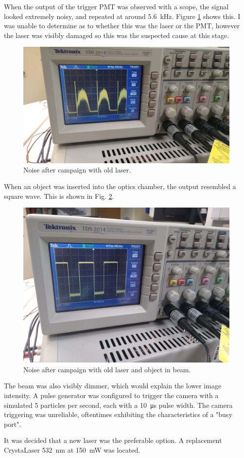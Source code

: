

When the output of the trigger PMT was observed with a scope, the signal looked extremely noisy, and repeated at around \SI{5.6}{\kilo\hertz}. Figure \ref{fig:PPDScopeNoise} shows this. I was unable to determine as to whether this was the laser or the PMT, however the laser was visibly damaged so this was the suspected cause at this stage.

\begin{figure}[H]
\begin{center}
\includegraphics[width=0.5\linewidth]{Figures/PPDScopeNoise}
\end{center}
\caption{Noise after campaign with old laser.}
\label{fig:PPDScopeNoise}
\end{figure}

When an object was inserted into the optics chamber, the output resembled a square wave. This is shown in Fig. \ref{fig:PPDScatterOutput}.

\begin{figure}[H]
\begin{center}
\includegraphics[width=0.5\linewidth]{Figures/PPDScatterOutput}
\end{center}
\caption{Noise after campaign with old laser and object in beam.}
\label{fig:PPDScatterOutput}
\end{figure}

The beam was also visibly dimmer, which would explain the lower image intensity. A pulse generator was configured to trigger the camera with a simulated 5 particles per second, each with a \SI{10}{\micro\second} pulse width. The camera triggering was unreliable, oftentimes exhibiting the characteristics of a "busy port".

It was decided that a new laser was the preferable option. A replacement CrystaLaser \SI{532}{\nano\metre} at \SI{150}{\milli\watt} was located.
